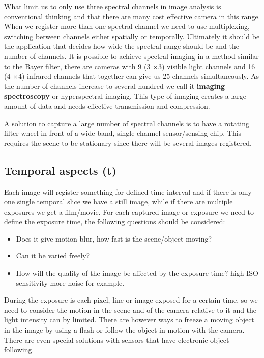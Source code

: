 What limit us to only use three spectral channels in image analysis is conventional thinking and that there are many cost effective camera in this range. When we register more than one spectral channel we need to use multiplexing, switching between channels either spatially or temporally. Ultimately it should be the application that decides how wide the spectral range should be and the number of channels. It is possible to achieve spectral imaging in a method similar to the Bayer filter, there are cameras with 9 (3 $\times$3) visible light channels and 16 (4 $\times$4) infrared channels that together can give us 25 channels simultaneously. As the number of channels increase to several hundred we call it \textbf{imaging spectroscopy} or hyperspectral imaging. This type of imaging creates a large amount of data and needs effective transmission and compression. 

A solution to capture a large number of spectral channels is to have a rotating filter wheel in front of a wide band, single channel sensor/sensing chip. This requires the scene to be stationary since there will be several images registered.

\subsection*{Temporal aspects (\textbf{t})}
Each image will register something for defined time interval and if there is only one single temporal slice we have a still image, while if there are multiple exposures we get a film/movie. For each captured image or exposure we need to define the exposure time, the following questions should be considered:

\begin{itemize}
	\item Does it give motion blur, how fast is the scene/object moving?
	\item Can it be varied freely?
	\item How will the quality of the image be affected by the exposure time? high ISO sensitivity more noise for example. 
\end{itemize}

During the exposure is each pixel, line or image exposed for a certain time, so we need to consider the motion in the scene and of the camera relative to it and the light intensity can by limited. There are however ways to freeze a moving object in the image by using a flash or follow the object in motion with the camera. There are even special solutions with sensors that have electronic object following. 

